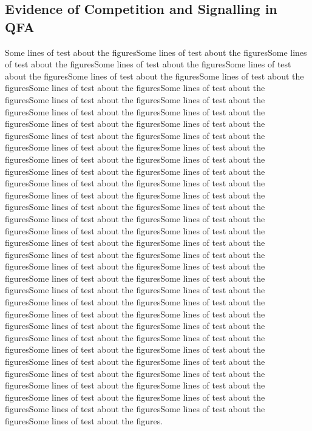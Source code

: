 \begin{multicols}{2}
\subsection{Evidence of Competition and Signalling in QFA}
Some lines of test about the figuresSome lines of test about the figuresSome lines of test about the figuresSome lines of test about the figuresSome lines of test about the figuresSome lines of test about the figuresSome lines of test about the figuresSome lines of test about the figuresSome lines of test about the figuresSome lines of test about the figuresSome lines of test about the figuresSome lines of test about the figuresSome lines of test about the figuresSome lines of test about the figuresSome lines of test about the figuresSome lines of test about the figuresSome lines of test about the figuresSome lines of test about the figuresSome lines of test about the figuresSome lines of test about the figuresSome lines of test about the figuresSome lines of test about the figuresSome lines of test about the figuresSome lines of test about the figuresSome lines of test about the figuresSome lines of test about the figuresSome lines of test about the figuresSome lines of test about the figuresSome lines of test about the figuresSome lines of test about the figuresSome lines of test about the figuresSome lines of test about the figuresSome lines of test about the figuresSome lines of test about the figuresSome lines of test about the figuresSome lines of test about the figuresSome lines of test about the figuresSome lines of test about the figuresSome lines of test about the figuresSome lines of test about the figuresSome lines of test about the figuresSome lines of test about the figuresSome lines of test about the figuresSome lines of test about the figuresSome lines of test about the figuresSome lines of test about the figuresSome lines of test about the figuresSome lines of test about the figuresSome lines of test about the figuresSome lines of test about the figuresSome lines of test about the figuresSome lines of test about the figuresSome lines of test about the figuresSome lines of test about the figuresSome lines of test about the figuresSome lines of test about the figuresSome lines of test about the figuresSome lines of test about the figuresSome lines of test about the figuresSome lines of test about the figuresSome lines of test about the figuresSome lines of test about the figuresSome lines of test about the figuresSome lines of test about the figures.


\end{multicols}

